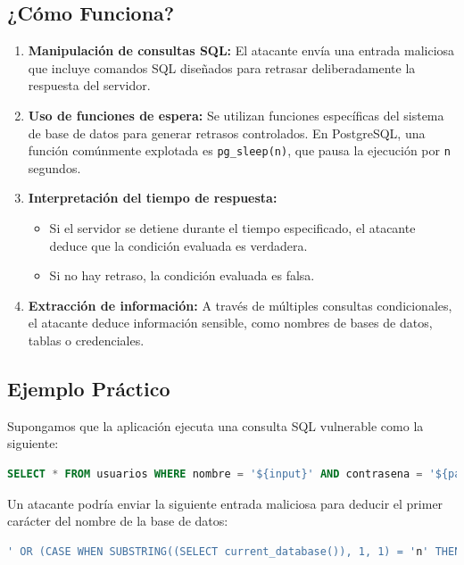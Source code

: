 \documentclass[a4paper,12pt]{article}
\begin{document}
\subsection{¿Cómo Funciona?}

\begin{enumerate}
    \item \textbf{Manipulación de consultas SQL:}  
    El atacante envía una entrada maliciosa que incluye comandos SQL diseñados para retrasar deliberadamente la respuesta del servidor.

    \item \textbf{Uso de funciones de espera:}  
    Se utilizan funciones específicas del sistema de base de datos para generar retrasos controlados. En PostgreSQL, una función comúnmente explotada es \texttt{pg\_sleep(n)}, que pausa la ejecución por \texttt{n} segundos.

    \item \textbf{Interpretación del tiempo de respuesta:}  
    \begin{itemize}
        \item Si el servidor se detiene durante el tiempo especificado, el atacante deduce que la condición evaluada es verdadera.
        \item Si no hay retraso, la condición evaluada es falsa.
    \end{itemize}

    \item \textbf{Extracción de información:}  
    A través de múltiples consultas condicionales, el atacante deduce información sensible, como nombres de bases de datos, tablas o credenciales.
\end{enumerate}

\subsection{Ejemplo Práctico}

Supongamos que la aplicación ejecuta una consulta SQL vulnerable como la siguiente:

\begin{lstlisting}[language=SQL]
SELECT * FROM usuarios WHERE nombre = '${input}' AND contrasena = '${password}';
\end{lstlisting}

Un atacante podría enviar la siguiente entrada maliciosa para deducir el primer carácter del nombre de la base de datos:

\begin{lstlisting}[language=SQL]
' OR (CASE WHEN SUBSTRING((SELECT current_database()), 1, 1) = 'n' THEN pg_sleep(5) ELSE pg_sleep(0) END) --
\end{lstlisting}
\end{document}
